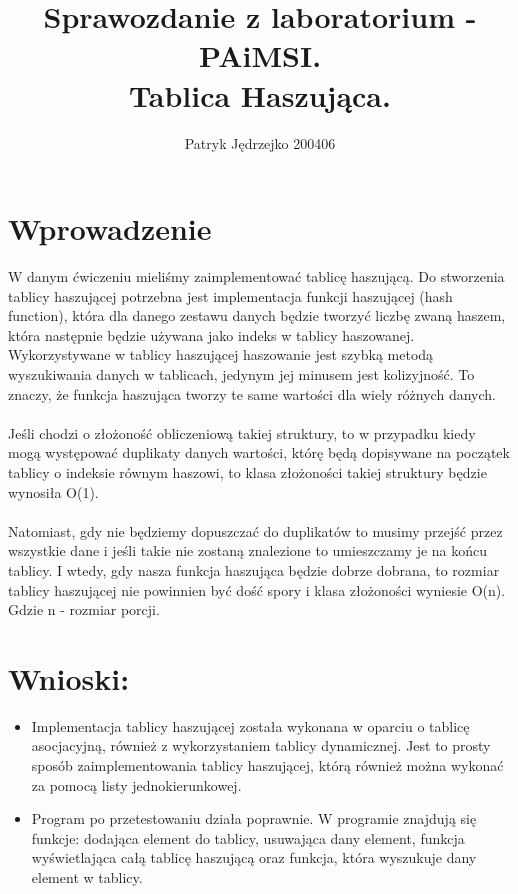 \documentclass{article}
\author{Patryk Jędrzejko 200406}
\title{Sprawozdanie z laboratorium - PAiMSI. \\Tablica Haszująca.}
\begin{document}
\maketitle

\section{Wprowadzenie}

\indent W danym ćwiczeniu mieliśmy zaimplementować tablicę haszującą. Do stworzenia tablicy haszującej potrzebna jest implementacja funkcji haszującej (hash function), która dla danego zestawu danych będzie tworzyć liczbę zwaną haszem, która następnie będzie używana jako indeks w tablicy haszowanej. Wykorzystywane w tablicy haszującej haszowanie jest szybką metodą wyszukiwania danych w tablicach, jedynym jej minusem jest kolizyjność. To znaczy, że funkcja haszująca tworzy te same wartości dla wiely różnych danych.
\\\\\indent Jeśli chodzi o złożoność obliczeniową takiej struktury, to w przypadku kiedy mogą występować duplikaty danych wartości, którę będą dopisywane na początek tablicy o indeksie równym haszowi, to klasa złożoności takiej struktury będzie wynosiła O(1).
\\\\\indent Natomiast, gdy nie będziemy dopuszczać do duplikatów to musimy przejść przez wszystkie dane i jeśli takie nie zostaną znalezione to umieszczamy je na końcu tablicy. I wtedy, gdy nasza funkcja haszująca będzie dobrze dobrana, to rozmiar tablicy haszującej nie powinnien być dość spory i klasa złożoności wyniesie O(n). Gdzie n - rozmiar porcji.


\section{Wnioski:}
\begin{itemize}
  \item Implementacja tablicy haszującej została wykonana w oparciu o tablicę asocjacyjną, również z wykorzystaniem tablicy dynamicznej. Jest to prosty sposób zaimplementowania tablicy haszującej, którą również można wykonać za pomocą listy jednokierunkowej.
  \item Program po przetestowaniu działa poprawnie. W programie znajdują się funkcje: dodająca element do tablicy, usuwająca dany element, funkcja wyświetlająca całą tablicę haszującą oraz funkcja, która wyszukuje dany element w tablicy.
\end{itemize}
\end{document}
